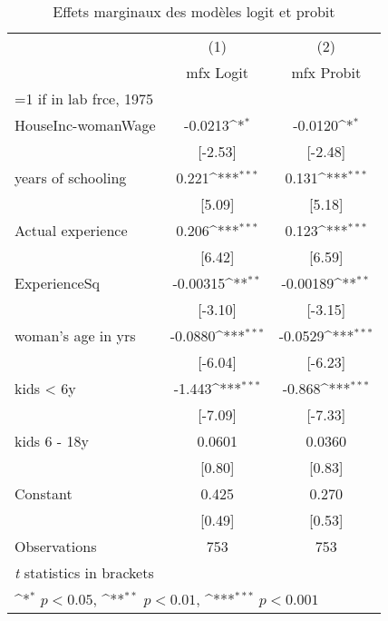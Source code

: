 \begin{table}[htbp]\centering
\def\sym#1{\ifmmode^{#1}\else\(^{#1}\)\fi}
\caption{Effets marginaux des modèles logit et probit}
\begin{tabular}{l*{2}{c}}
\hline\hline
                    &\multicolumn{1}{c}{(1)}&\multicolumn{1}{c}{(2)}\\
                    &\multicolumn{1}{c}{mfx Logit}&\multicolumn{1}{c}{mfx Probit}\\
\hline
=1 if in lab frce, 1975&                     &                     \\
HouseInc-womanWage  &     -0.0213\sym{*}  &     -0.0120\sym{*}  \\
                    &     [-2.53]         &     [-2.48]         \\
[1em]
years of schooling  &       0.221\sym{***}&       0.131\sym{***}\\
                    &      [5.09]         &      [5.18]         \\
[1em]
Actual experience   &       0.206\sym{***}&       0.123\sym{***}\\
                    &      [6.42]         &      [6.59]         \\
[1em]
ExperienceSq        &    -0.00315\sym{**} &    -0.00189\sym{**} \\
                    &     [-3.10]         &     [-3.15]         \\
[1em]
woman's age in yrs  &     -0.0880\sym{***}&     -0.0529\sym{***}\\
                    &     [-6.04]         &     [-6.23]         \\
[1em]
kids < 6y           &      -1.443\sym{***}&      -0.868\sym{***}\\
                    &     [-7.09]         &     [-7.33]         \\
[1em]
kids 6 - 18y        &      0.0601         &      0.0360         \\
                    &      [0.80]         &      [0.83]         \\
[1em]
Constant            &       0.425         &       0.270         \\
                    &      [0.49]         &      [0.53]         \\
\hline
Observations        &         753         &         753         \\
\hline\hline
\multicolumn{3}{l}{\footnotesize \textit{t} statistics in brackets}\\
\multicolumn{3}{l}{\footnotesize \sym{*} \(p<0.05\), \sym{**} \(p<0.01\), \sym{***} \(p<0.001\)}\\
\end{tabular}
\end{table}

